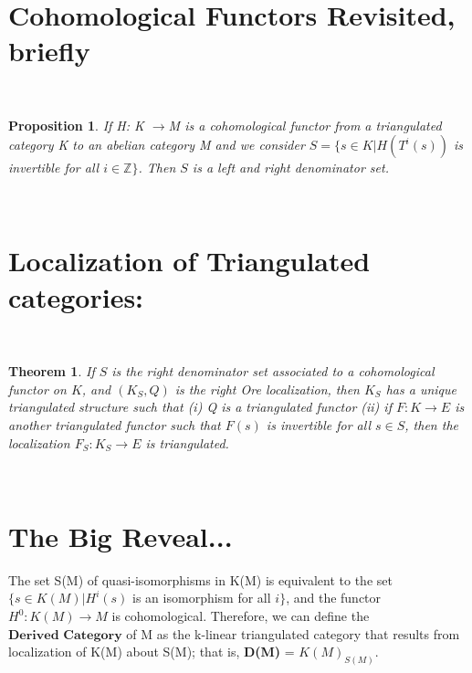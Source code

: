 \documentclass[12pt]{amsart}    %
\newtheorem{theorem}{Theorem}[section]
\newtheorem{proposition}{Proposition}
\theoremstyle{definition}
\begin{document}
\

\section{Cohomological Functors Revisited, briefly}


\

\begin{proposition}
If H: K $\rightarrow $M is a cohomological functor from a triangulated category K to an abelian category M and we consider $S = \{ s \in K | H(T^i(s)) $ is invertible for all $i \in \mathbb{Z}\}$.  Then $S$ is a left and right denominator set.  
\end{proposition}
\

\section{Localization of Triangulated categories:}


\

\begin{theorem}
If $S$ is the right denominator set associated to a cohomological functor on $K$, and $(K_S, Q)$ is the right Ore localization, then $K_S$ has a unique triangulated structure such that (i) Q is a triangulated functor (ii) if $F : K \rightarrow E$ is another triangulated functor such that $F(s)$ is invertible for all $s \in S$, then the localization $F_S: K_S \rightarrow E$ is triangulated.
\end{theorem}

\

\section{The Big Reveal...}


The set S(M) of quasi-isomorphisms in K(M) is equivalent to the set $\{s \in K(M) | H^i(s)$ is an isomorphism for all $i \}$, and the functor $H^0: K(M) \rightarrow M$ is cohomological.  Therefore, we can define the $\textbf{Derived Category}$ of M as the k-linear triangulated category that results from localization of K(M) about S(M); that is, \textbf{D(M)} = \textbf{$K(M)_{S(M)}$}.  
\end{document}
